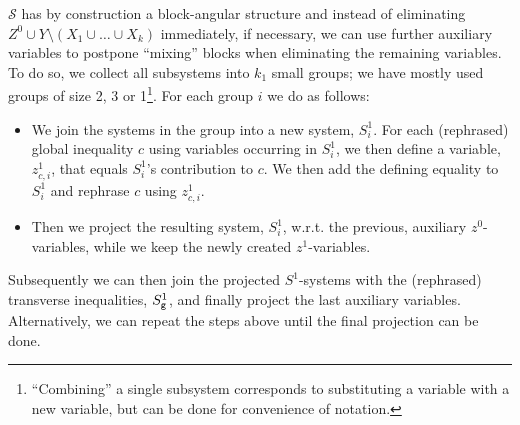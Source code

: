 $\mathcal{S}$ has by construction a block-angular structure and instead of eliminating $Z^0\cup Y\setminus(X_1\cup\ldots\cup X_k)$ immediately, if necessary, we can use further auxiliary variables to postpone ``mixing'' blocks when eliminating the remaining variables. 
To do so, we collect all subsystems into $k_1$ small groups; we have mostly used groups of size 2, 3 or 1\footnote{``Combining'' a single subsystem corresponds to substituting a variable with a new variable, but can be done for convenience of notation.}. For each group $i$ we do as follows:
\begin{itemize}\itemsep0em
\item We join the systems in the group into a new system, $S^1_i$. For each (rephrased) global inequality $c$ using variables occurring in $S^1_i$, we then define a variable, $z^1_{c,i}$, that equals $S^1_i$'s contribution to $c$. We then add the defining equality to $S^1_i$ and rephrase $c$ using $z^1_{c,i}$.
\item Then we project the resulting system, $S^1_i$, w.r.t. the previous, auxiliary $z^0$-variables, while we keep the newly created $z^1$-variables.
\end{itemize} 
Subsequently we can then join the projected $S^1$-systems with the (rephrased) transverse inequalities, $S_{\texttt{g}}^1$, and finally project the last auxiliary variables. Alternatively, we can repeat the steps above until the final projection can be done. 


